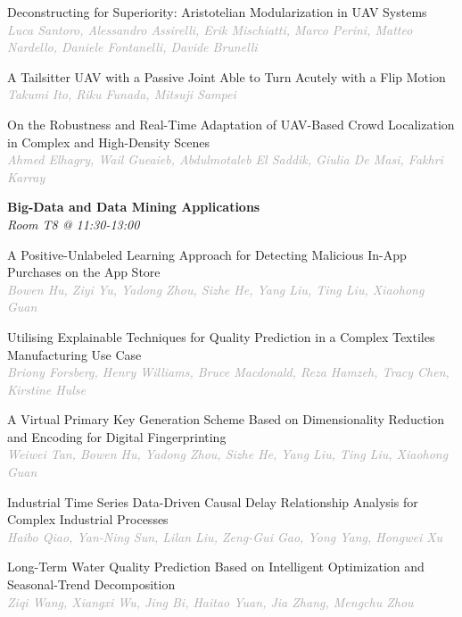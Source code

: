 \begin{multicols*}{2}
\small Deconstructing for Superiority: Aristotelian Modularization in UAV Systems\\ 
\footnotesize \textcolor{darkgray}{\textit{Luca Santoro, Alessandro  Assirelli, Erik  Mischiatti, Marco  Perini, Matteo  Nardello, Daniele  Fontanelli, Davide  Brunelli}}

\small A Tailsitter UAV with a Passive Joint Able to Turn Acutely with a Flip Motion\\ 
\footnotesize \textcolor{darkgray}{\textit{Takumi Ito, Riku  Funada, Mitsuji  Sampei}}

\small On the Robustness and Real-Time Adaptation of UAV-Based Crowd Localization in Complex and High-Density Scenes\\ 
\footnotesize \textcolor{darkgray}{\textit{Ahmed Elhagry, Wail  Gueaieb, Abdulmotaleb  El Saddik, Giulia  De Masi, Fakhri  Karray}}

\normalsize \textbf{Big-Data and Data Mining Applications}\\
\small \textit{Room T8 @ 11:30-13:00}

\small A Positive-Unlabeled Learning Approach for Detecting Malicious In-App Purchases on the App Store\\ 
\footnotesize \textcolor{darkgray}{\textit{Bowen Hu, Ziyi  Yu, Yadong  Zhou, Sizhe  He, Yang  Liu, Ting  Liu, Xiaohong  Guan}}

\small Utilising Explainable Techniques for Quality Prediction in a Complex Textiles Manufacturing Use Case\\ 
\footnotesize \textcolor{darkgray}{\textit{Briony Forsberg, Henry  Williams, Bruce  Macdonald, Reza  Hamzeh, Tracy  Chen, Kirstine  Hulse}}

\small A Virtual Primary Key Generation Scheme Based on Dimensionality Reduction and Encoding for Digital Fingerprinting\\ 
\footnotesize \textcolor{darkgray}{\textit{Weiwei Tan, Bowen  Hu, Yadong  Zhou, Sizhe  He, Yang  Liu, Ting  Liu, Xiaohong  Guan}}

\small Industrial Time Series Data-Driven Causal Delay Relationship Analysis for Complex Industrial Processes\\ 
\footnotesize \textcolor{darkgray}{\textit{Haibo Qiao, Yan-Ning  Sun, Lilan  Liu, Zeng-Gui  Gao, Yong  Yang, Hongwei  Xu}}

\small Long-Term Water Quality Prediction Based on Intelligent Optimization and Seasonal-Trend Decomposition\\ 
\footnotesize \textcolor{darkgray}{\textit{Ziqi Wang, Xiangxi  Wu, Jing  Bi, Haitao  Yuan, Jia  Zhang, Mengchu  Zhou}}


\end{multicols*}
